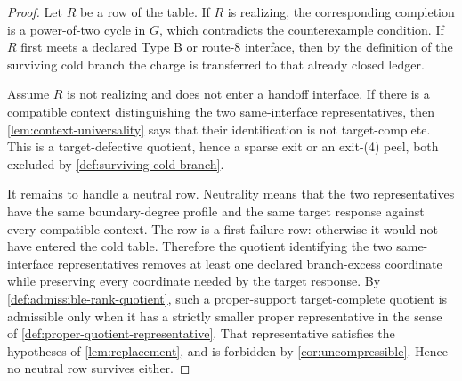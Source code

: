 \documentclass[11pt]{article}
\begin{document}
\begin{proof}
Let \(R\) be a row of the table.  If \(R\) is realizing, the corresponding
completion is a power-of-two cycle in \(G\), which contradicts the
counterexample condition.  If \(R\) first meets a declared Type B or route-8
interface, then by the definition of the surviving cold branch the charge is
transferred to that already closed ledger.

Assume \(R\) is not realizing and does not enter a handoff interface.  If
there is a compatible context distinguishing the two same-interface
representatives, then \cref{lem:context-universality} says that their
identification is not target-complete.  This is a target-defective quotient,
hence a sparse exit or an exit-\textup{(4)} peel, both excluded by
\cref{def:surviving-cold-branch}.

It remains to handle a neutral row.  Neutrality means that the two
representatives have the same boundary-degree profile and the same target
response against every compatible context.  The row is a first-failure row:
otherwise it would not have entered the cold table.  Therefore the quotient
identifying the two same-interface representatives removes at least one
declared branch-excess coordinate while preserving every coordinate needed by
the target response.  By \cref{def:admissible-rank-quotient}, such a
proper-support target-complete quotient is admissible only when it has a
strictly smaller proper representative in the sense of
\cref{def:proper-quotient-representative}.  That representative satisfies the
hypotheses of \cref{lem:replacement}, and is forbidden by
\cref{cor:uncompressible}.  Hence no neutral row survives either.
\end{proof}
\end{document}
